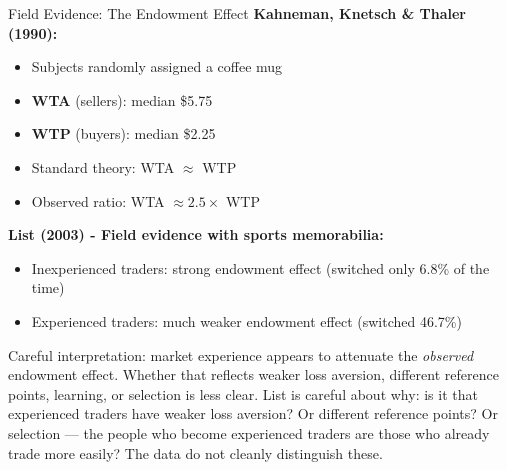 \documentclass[10pt]{beamer}
\begin{document}
\begin{frame}[allowframebreaks]{Field Evidence: The Endowment Effect}
\textbf{Kahneman, Knetsch \& Thaler (1990):}

\begin{itemize}
\item Subjects randomly assigned a coffee mug
\item \textbf{WTA} (sellers): median \$5.75
\item \textbf{WTP} (buyers): median \$2.25
\item Standard theory: WTA $\approx$ WTP
\item \alert{Observed ratio:} WTA $\approx 2.5 \times$ WTP
\end{itemize}


\textbf{List (2003) - Field evidence with sports memorabilia:}
\begin{itemize}
\item Inexperienced traders: strong endowment effect (switched only 6.8\% of the time)
\item Experienced traders: much weaker endowment effect (switched 46.7\%)
\end{itemize}


\alert{Careful interpretation:} market experience appears to attenuate the \emph{observed} endowment effect. Whether that reflects weaker loss aversion, different reference points, learning, or selection is less clear.
List is careful about why: is it that experienced traders have weaker loss aversion? Or different reference points? Or selection — the people who become experienced traders are those who already trade more easily? The data do not cleanly distinguish these.
\end{frame}
\end{document}
